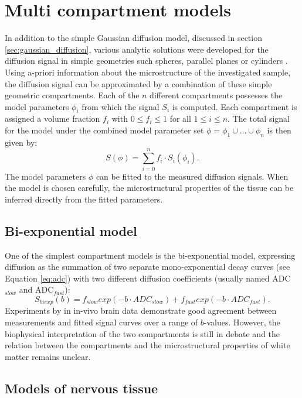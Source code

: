 \section{Multi compartment models}
\label{sec:multicompartment_modeling}
In addition to the simple Gaussian diffusion model, discussed in section \ref{sec:gaussian_diffusion}, various analytic solutions were developed for the diffusion signal in simple geometries such spheres, parallel planes \citep{Balinov:1993, Linse:1995, Callaghan:1996} or cylinders \citep{Gelderen:1994}. Using a-priori information about the microstructure of the investigated sample, the diffusion signal can be approximated by a combination of these simple geometric compartments. Each of the $n$ different compartments possesses the model parameters $\phi_{i}$ from which the signal $S_i$ is computed. Each compartment is assigned a volume fraction $f_i$ with $0 \le f_i \le 1$ for all $1 \le i \le n$. The total signal for the model under the combined model parameter set $\phi=\phi_{1}\cup\dots\cup\phi_{n}$ is then given by:
\begin{equation}
	S(\phi)=\sum_{i=0}^{n}f_i\cdot S_i(\phi_i).
\end{equation}
The model parameters $\phi$ can be fitted to the measured diffusion signals. When the model is chosen carefully, the microstructural properties of the tissue  can be inferred directly from the fitted parameters.


\subsection*{Bi-exponential model}
One of the simplest compartment models is the bi-exponential model, expressing diffusion as the summation of two separate mono-exponential decay curves (see Equation \ref{eq:adc}) with two different diffusion coefficients (usually named \gls{ADC}$_{slow}$ and \gls{ADC}$_{fast}$):
\begin{equation}
	S_{biexp}(b) = f_{slow} exp(-b\cdot ADC_{slow}) + f_{fast} exp(-b\cdot ADC_{fast}).
\end{equation}
Experiments by \citet{Clark:2002} in in-vivo brain data demonstrate good agreement between measurements and fitted signal curves over a range of $b$-values. However, the biophysical interpretation of the two compartments is still in debate and the relation between the compartments and the microstructural properties of white matter remains unclear. 
\subsection*{Models of nervous tissue}
